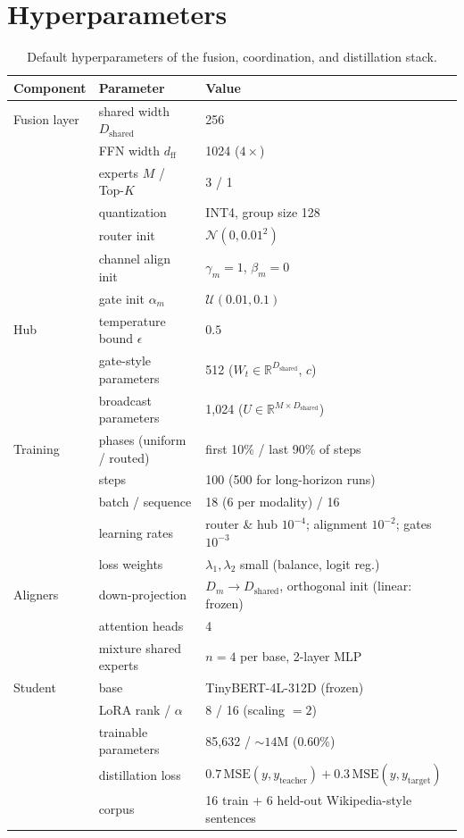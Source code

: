 \documentclass[10pt,twoside]{article}
\newcommand{\R}{\mathbb{R}}
\theoremstyle{definition}
\theoremstyle{plain}
\theoremstyle{remark}
\begin{document}
\appendix

\clearpage

\section{Hyperparameters}
\label{app:hyper}

\begin{table}[h]
\centering
\caption{Default hyperparameters of the fusion, coordination, and distillation stack.}
\small
\begin{tabular}{lll}
\toprule
\textbf{Component} & \textbf{Parameter} & \textbf{Value} \\
\midrule
Fusion layer & shared width $D_{\text{shared}}$ & 256 \\
 & FFN width $d_{\text{ff}}$ & 1024 ($4\times$) \\
 & experts $M$ / Top-$K$ & 3 / 1 \\
 & quantization & INT4, group size 128 \\
 & router init & $\mathcal{N}(0, 0.01^2)$ \\
 & channel align init & $\gamma_m = 1$, $\beta_m = 0$ \\
 & gate init $\alpha_m$ & $\mathcal{U}(0.01, 0.1)$ \\
\midrule
Hub & temperature bound $\epsilon$ & $0.5$ \\
 & gate-style parameters & 512 ($W_t \in \R^{D_{\text{shared}}}$, $c$) \\
 & broadcast parameters & 1{,}024 ($U \in \R^{M \times D_{\text{shared}}}$) \\
\midrule
Training & phases (uniform / routed) & first 10\% / last 90\% of steps \\
 & steps & 100 (500 for long-horizon runs) \\
 & batch / sequence & 18 (6 per modality) / 16 \\
 & learning rates & router \& hub $10^{-4}$; alignment $10^{-2}$; gates $10^{-3}$ \\
 & loss weights & $\lambda_1, \lambda_2$ small (balance, logit reg.) \\
\midrule
Aligners & down-projection & $D_m \rightarrow D_{\text{shared}}$, orthogonal init (linear: frozen) \\
 & attention heads & 4 \\
 & mixture shared experts & $n = 4$ per base, 2-layer MLP \\
\midrule
Student & base & TinyBERT-4L-312D (frozen) \\
 & LoRA rank / $\alpha$ & 8 / 16 (scaling $= 2$) \\
 & trainable parameters & 85{,}632 / ${\sim}14$M ($0.60\%$) \\
 & distillation loss & $0.7\,\mathrm{MSE}(y, y_{\text{teacher}}) + 0.3\,\mathrm{MSE}(y, y_{\text{target}})$ \\
 & corpus & 16 train + 6 held-out Wikipedia-style sentences \\
\bottomrule
\end{tabular}
\end{table}
\end{document}
